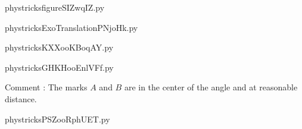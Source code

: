     

    \clearpage
    


    \newcommand{\CaptionFigfigureSIZwqIZ}{<+Type your caption here+>}
    \begin{center}
        
    \end{center}
    phystricksfigureSIZwqIZ.py

    

    \clearpage
    


    \newcommand{\CaptionFigExoTranslationPNjoHk}{<+Type your caption here+>}
    \begin{center}
        
    \end{center}
    phystricksExoTranslationPNjoHk.py

    

    \clearpage
    


    \newcommand{\CaptionFigKXXooKBoqAY}{<+Type your caption here+>}
    \begin{center}
        
    \end{center}
    phystricksKXXooKBoqAY.py

    

    \clearpage
    


    \newcommand{\CaptionFigGHKHooEnlVFf}{<+Type your caption here+>}
    \begin{center}
        
    \end{center}
    phystricksGHKHooEnlVFf.py

    Comment : The marks $A$ and $B$ are in the center of the angle and at reasonable distance.

    \clearpage
    


    \newcommand{\CaptionFigPSZooRphUET}{<+Type your caption here+>}
    \begin{center}
        
    \end{center}
    phystricksPSZooRphUET.py

    

